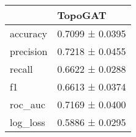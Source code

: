 \begin{tabular}{ll}
\toprule
 & TopoGAT \\
\midrule
accuracy & 0.7099 ± 0.0395 \\
precision & 0.7218 ± 0.0455 \\
recall & 0.6622 ± 0.0288 \\
f1 & 0.6613 ± 0.0374 \\
roc_auc & 0.7169 ± 0.0400 \\
log_loss & 0.5886 ± 0.0295 \\
\bottomrule
\end{tabular}
